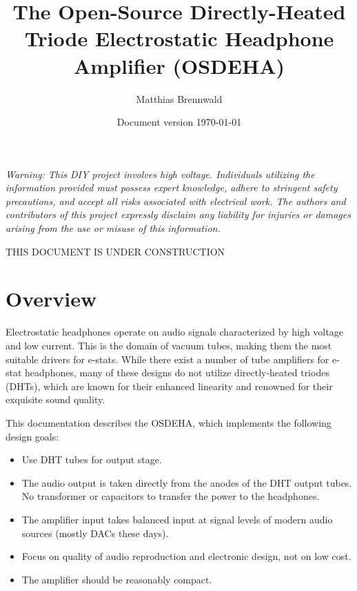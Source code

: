 





\title{The Open-Source Directly-Heated Triode Electrostatic Headphone Amplifier (OSDEHA)}
\author{Matthias Brennwald}
\date{Document version \today}




\maketitle

\emph{Warning: This DIY project involves high voltage. Individuals utilizing the information provided must possess expert knowledge, adhere to stringent safety precautions, and accept all risks associated with electrical work. The authors and contributors of this project expressly disclaim any liability for injuries or damages arising from the use or misuse of this information.}


THIS DOCUMENT IS UNDER CONSTRUCTION


\section{Overview}

Electrostatic headphones operate on audio signals characterized by high voltage and low current. This is the domain of vacuum tubes, making them the most suitable drivers for e-stats.  While there exist a number of tube amplifiers for e-stat headphones, many of these designs do not utilize directly-heated triodes (DHTs), which are known for their enhanced linearity and renowned for their exquisite sound quality.\par

This documentation describes the OSDEHA, which implements the following design goals:
\begin{itemize}
\item Use DHT tubes for output stage.
\item The audio output is taken directly from the anodes of the DHT output tubes. No transformer or capacitors to transfer the power to the headphones.
\item The amplifier input takes balanced input at signal levels of modern audio sources (mostly DACs these days).
\item Focus on quality of audio reproduction and electronic design, not on low cost.
\item The amplifier should be reasonably compact.
\end{itemize}


